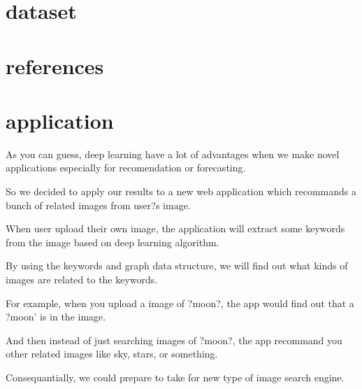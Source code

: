 \section{dataset}

\section{references}

\section{application}

As you can guess, deep learning have a lot of advantages when we make novel applications especially for recomendation or forecasting. 

So we decided to apply our results to a new web application which recommands a bunch of related images from user?s image. 

When user upload their own image, the application will extract some keywords from the image based on deep learning algorithm. 

By using the keywords and graph data structure, we will find out what kinds of images are related to the keywords. 

For example, when you upload a image of ?moon?, the app would find out that a ?moon' is in the image. 

And then instead of just searching images of ?moon?,  the app recommand you other related images like sky, stars, or something. 

Consequantially, we could prepare to take for new type of image search engine.

